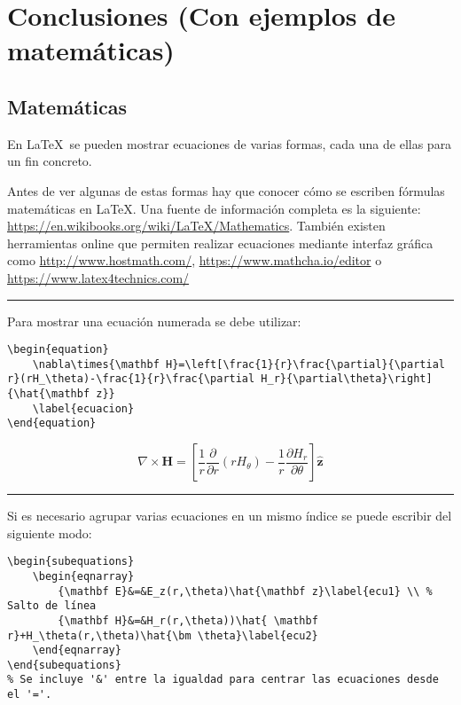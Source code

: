
\chapter{Conclusiones (Con ejemplos de matemáticas)}
\label{conclusiones}

\section{Matemáticas}

En \LaTeX~se pueden mostrar ecuaciones de varias formas, cada una de ellas para un fin concreto.
\par Antes de ver algunas de estas formas hay que conocer cómo se escriben fórmulas matemáticas en \LaTeX. Una fuente de información completa es la siguiente: \url{https://en.wikibooks.org/wiki/LaTeX/Mathematics}. También existen herramientas online que permiten realizar ecuaciones mediante interfaz gráfica como \url{http://www.hostmath.com/}, \url{https://www.mathcha.io/editor} o \url{https://www.latex4technics.com/}
\vspace{1em}
\noindent\hrule
\vspace{1em}
Para mostrar una ecuación numerada se debe utilizar:
\begin{lstlisting}[style=Latex-color,label=latex_code1]
\begin{equation}
	\nabla\times{\mathbf H}=\left[\frac{1}{r}\frac{\partial}{\partial r}(rH_\theta)-\frac{1}{r}\frac{\partial H_r}{\partial\theta}\right]{\hat{\mathbf z}}
	\label{ecuacion}
\end{equation}
\end{lstlisting}
\begin{equation}
  \nabla\times{\mathbf H}=\left[\frac{1}{r}\frac{\partial}{\partial
        r}(rH_\theta)-\frac{1}{r}\frac{\partial
        H_r}{\partial\theta}\right]{\hat{\mathbf z}}
        \label{ecuacion}
\end{equation}
\vspace{1em}
\noindent\hrule
\vspace{1em}
Si es necesario agrupar varias ecuaciones en un mismo índice se puede escribir del siguiente modo:

\begin{lstlisting}[style=Latex-color,label=latex_code2]
\begin{subequations}
	\begin{eqnarray}
    	{\mathbf E}&=&E_z(r,\theta)\hat{\mathbf z}\label{ecu1} \\ % Salto de línea
    	{\mathbf H}&=&H_r(r,\theta))\hat{ \mathbf r}+H_\theta(r,\theta)\hat{\bm \theta}\label{ecu2}
	\end{eqnarray}
\end{subequations}
% Se incluye '&' entre la igualdad para centrar las ecuaciones desde el '='.
\end{lstlisting}

